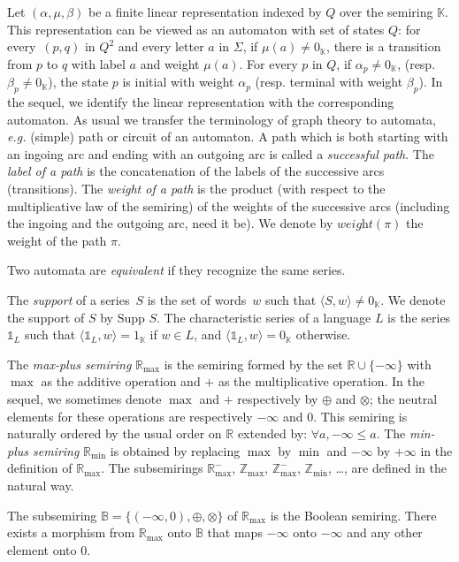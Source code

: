 \documentclass{article}
\newcommand{\supp}[1]{\text{Supp }#1}
\newcommand{\Z} {\ensuremath{\mathbb{Z}}}
\newcommand{\R} {\ensuremath{\mathbb{R}}}
\newcommand{\B} {\ensuremath{\mathbb{B}}}
\newcommand{\Zmin} {\Z_{\min}}
\newcommand{\Zmax} {\Z_{\max}}
\newcommand{\Rmax} {\R_{\max}}
\newcommand{\1}{\mathbb{1}}
\newcommand{\0}{\mathbb{0}}
\newcommand{\wght}[1]{\textit{weight}\left(#1\right)}
\newcommand{\coef}[2]{\langle #1, #2\rangle}
\def\ab{\Sigma}
\begin{document}
\medskip

Let $(\alpha,\mu,\beta)$ be a finite linear representation indexed by $Q$
over the semiring $\mathbb{K}$. This representation can be viewed as an automaton
with set of states $Q$:
for every~$(p,q)$ in $Q^2$ and every letter $a$ in
$\ab$, if $\mu(a)\neq 0_\mathbb{K}$, there is a transition from $p$ to $q$
with label $a$ and weight $\mu(a)$. For every $p$ in $Q$,
if $\alpha_p\neq 0_\mathbb{K}$, (resp. $\beta_p\neq 0_\mathbb{K}$),
the state $p$ is initial with weight $\alpha_p$ (resp. terminal
with weight $\beta_p$). In the sequel, we identify the linear representation
with the corresponding automaton.
As usual we transfer the terminology of graph theory to automata, {\it e.g.}
(simple) path or circuit of an automaton. A path which is both starting with an ingoing arc and 
ending with an outgoing arc is called a {\em successful path}.  
The {\em label of a path} is the concatenation of the labels of the
successive arcs (transitions). The {\em weight of a 
  path} is the product (with respect to the multiplicative law of the
semiring) of the weights of the successive 
arcs (including the ingoing and the outgoing arc, need it be).
We denote by $\wght{\pi}$ the weight of the path $\pi$.

Two automata are {\em equivalent} if they recognize the same series. 

\medskip

The {\em support} of a series~$S$ is the set of words~$w$ such that
 $\coef{S}{w}\neq0_\mathbb{K}$. We denote the support of $S$ by $\supp{S}$. The
 characteristic series of a language $L$ is the series 
  $\1_L$ such that $\coef{\1_L}{w}=1_\mathbb{K}$ if $w\in L$, and
  $\coef{\1_L}{w}=0_\mathbb{K}$ otherwise.

\medskip

The {\em max-plus semiring} $\Rmax$ is the semiring formed by the set
$\R\cup\{-\infty\}$ with $\max$ as 
the additive operation and $+$ as the multiplicative operation.
In the sequel, we sometimes denote $\max$ and $+$ respectively by $\oplus$ and
$\otimes$; the neutral elements for these operations are respectively
$-\infty$ and $0$. This semiring
is naturally ordered by the usual order on $\R$ extended by: $\forall
a, -\infty \leq a$. 
The {\em min-plus semiring} $\R_{\min}$ is obtained by replacing
$\max$ by $\min$ and $-\infty$ by $+\infty$
in the definition of $\Rmax$.
The subsemirings $\Rmax^{-}$, $\Zmax$, $\Zmax^{-}$, $\Zmin$, \ldots, are defined in the natural
way. 


The subsemiring $\B=\{(-\infty,0), \oplus, \otimes\}$ of $\Rmax$ is
the Boolean semiring. 
There exists a
morphism from $\Rmax$ 
onto $\B$ that maps $-\infty$ onto $-\infty$ and
any other element onto $0$.
\end{document}

